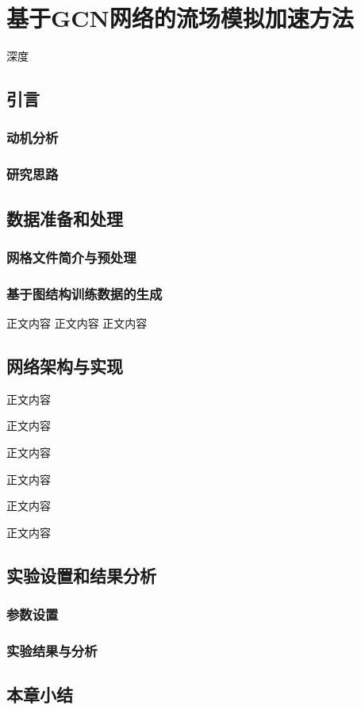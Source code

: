 \chapter{基于GCN网络的流场模拟加速方法}
深度

\section{引言}

\subsection{动机分析}

\subsection{研究思路}

\section{数据准备和处理}


\subsection{网格文件简介与预处理}

\subsection{基于图结构训练数据的生成}
正文内容
正文内容
正文内容



\section{网络架构与实现}
正文内容

正文内容



正文内容

正文内容

正文内容

正文内容

\section{实验设置和结果分析}

\subsection{参数设置}



\subsection{实验结果与分析}



\section{本章小结}

